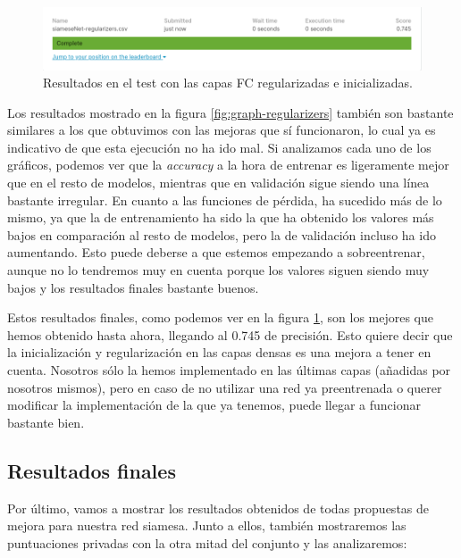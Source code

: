 \documentclass[11pt,a4paper]{article}
\begin{document}
\begin{figure}[H]
    \centering
    \includegraphics[scale=0.55]{img/siameseNet-regularizers.png}
    \caption{Resultados en el test con las capas FC regularizadas e inicializadas.}
    \label{fig:test-regularizers}
\end{figure}

Los resultados mostrado en la figura \ref{fig:graph-regularizers} también son bastante similares a los que obtuvimos
con las mejoras que sí funcionaron, lo cual ya es indicativo de que esta ejecución no ha ido mal. Si analizamos cada uno
de los gráficos, podemos ver que la \textit{accuracy} a la hora de entrenar es ligeramente mejor que en el resto de
modelos, mientras que en validación sigue siendo una línea bastante irregular. En cuanto a las funciones de pérdida,
ha sucedido más de lo mismo, ya que la de entrenamiento ha sido la que ha obtenido los valores más bajos en comparación
al resto de modelos, pero la de validación incluso ha ido aumentando. Esto puede deberse a que estemos empezando a
sobreentrenar, aunque no lo tendremos muy en cuenta porque los valores siguen siendo muy bajos y los resultados finales
bastante buenos.

Estos resultados finales, como podemos ver en la figura \ref{fig:test-regularizers}, son los mejores que hemos obtenido
hasta ahora, llegando al 0.745 de precisión. Esto quiere decir que la inicialización y regularización en las
capas densas es una mejora a tener en cuenta. Nosotros sólo la hemos implementado en las últimas capas (añadidas por
nosotros mismos), pero en caso de no utilizar una red ya preentrenada o querer modificar la implementación de la que ya
tenemos, puede llegar a funcionar bastante bien.

\subsection{Resultados finales}

Por último, vamos a mostrar los resultados obtenidos de todas propuestas de mejora para nuestra red siamesa. Junto a ellos,
también mostraremos las puntuaciones privadas con la otra mitad del conjunto y las analizaremos:
\end{document}

